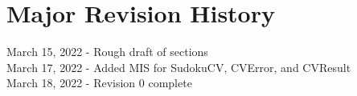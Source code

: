 \documentclass[11pt]{article}
\begin{document}
    
\section{Major Revision History}
March 15, 2022 - Rough draft of sections\\
March 17, 2022 - Added MIS for SudokuCV, CVError, and CVResult \\
March 18, 2022 - Revision 0 complete

			
\end{document}
